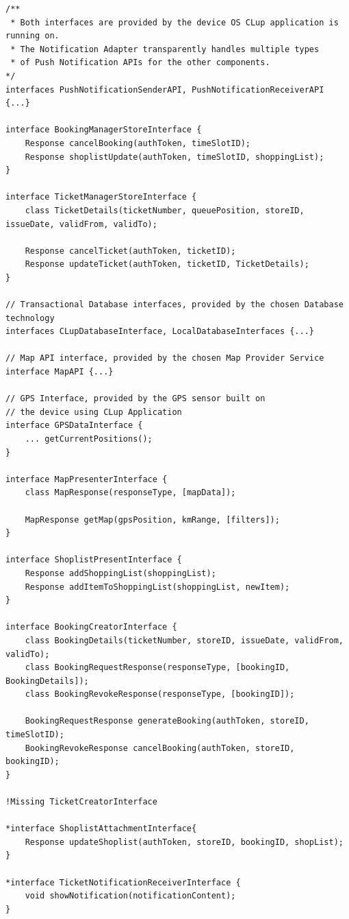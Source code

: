 \begin{lstlisting}
/** 
 * Both interfaces are provided by the device OS CLup application is running on.
 * The Notification Adapter transparently handles multiple types 
 * of Push Notification APIs for the other components.
*/
interfaces PushNotificationSenderAPI, PushNotificationReceiverAPI {...}

interface BookingManagerStoreInterface {
    Response cancelBooking(authToken, timeSlotID);
    Response shoplistUpdate(authToken, timeSlotID, shoppingList);
}

interface TicketManagerStoreInterface {
    class TicketDetails(ticketNumber, queuePosition, storeID, issueDate, validFrom, validTo);

    Response cancelTicket(authToken, ticketID);
    Response updateTicket(authToken, ticketID, TicketDetails);
}

// Transactional Database interfaces, provided by the chosen Database technology
interfaces CLupDatabaseInterface, LocalDatabaseInterfaces {...}

// Map API interface, provided by the chosen Map Provider Service
interface MapAPI {...}

// GPS Interface, provided by the GPS sensor built on 
// the device using CLup Application
interface GPSDataInterface {
    ... getCurrentPositions();
}

interface MapPresenterInterface {
    class MapResponse(responseType, [mapData]);

    MapResponse getMap(gpsPosition, kmRange, [filters]);
}

interface ShoplistPresentInterface {
    Response addShoppingList(shoppingList);
    Response addItemToShoppingList(shoppingList, newItem);
}

interface BookingCreatorInterface {
    class BookingDetails(ticketNumber, storeID, issueDate, validFrom, validTo);
    class BookingRequestResponse(responseType, [bookingID, BookingDetails]);
    class BookingRevokeResponse(responseType, [bookingID]);

    BookingRequestResponse generateBooking(authToken, storeID, timeSlotID);
    BookingRevokeResponse cancelBooking(authToken, storeID, bookingID);
}

!Missing TicketCreatorInterface

*interface ShoplistAttachmentInterface{
    Response updateShoplist(authToken, storeID, bookingID, shopList);
}

*interface TicketNotificationReceiverInterface {
    void showNotification(notificationContent);
}


\end{lstlisting}
